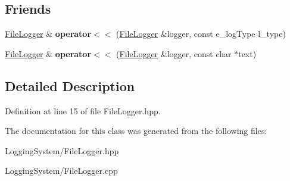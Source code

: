 \subsection*{Friends}
\begin{DoxyCompactItemize}
\item 
\mbox{\label{classlogging_1_1_file_logger_a7e61ff7789620dd939e3d74a21864165}} 
\hyperlink{classlogging_1_1_file_logger}{File\+Logger} \& {\bfseries operator$<$$<$} (\hyperlink{classlogging_1_1_file_logger}{File\+Logger} \&logger, const e\+\_\+log\+Type l\+\_\+type)
\item 
\mbox{\label{classlogging_1_1_file_logger_a04cbb232057dc92645ff01c3398c8834}} 
\hyperlink{classlogging_1_1_file_logger}{File\+Logger} \& {\bfseries operator$<$$<$} (\hyperlink{classlogging_1_1_file_logger}{File\+Logger} \&logger, const char $\ast$text)
\end{DoxyCompactItemize}


\subsection{Detailed Description}


Definition at line 15 of file File\+Logger.\+hpp.



The documentation for this class was generated from the following files\+:\begin{DoxyCompactItemize}
\item 
Logging\+System/File\+Logger.\+hpp\item 
Logging\+System/File\+Logger.\+cpp\end{DoxyCompactItemize}
